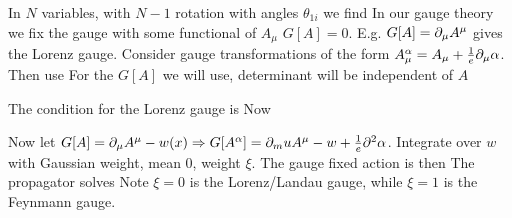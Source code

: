 \documentclass{article}
\begin{document}
In $N$ variables, with $N-1$ rotation with angles $\theta_{1i}$ we find 
In our gauge theory we fix the gauge with some functional of $A_\mu$ $G[A]=0$. E.g. $G[A] = \partial_\mu A^\mu$ gives the Lorenz gauge. Consider gauge transformations of the form $A_\mu^\alpha = A_\mu + \frac{1}{e} \partial_\mu \alpha$. Then use 
For the $G[A]$ we will use, determinant will be independent of $A$
\begin{example}
The condition for the Lorenz gauge is 
Now 
\end{example}

Now let $G[A] = \partial_\mu A^\mu - w(x) \Rightarrow G[A^\alpha] = \partial_mu A^\mu - w + \frac{1}{e} \partial^2 \alpha$. Integrate over $w$ with Gaussian weight, mean 0, weight $\xi$. 
The gauge fixed action is then 
The propagator solves 
Note $\xi = 0$ is the Lorenz/Landau gauge, while $\xi = 1$ is the Feynmann gauge. 
\end{document}
